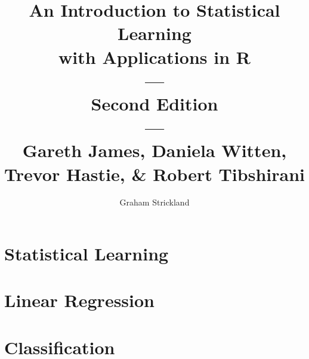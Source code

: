\documentclass{article}
\title{
    An Introduction to Statistical Learning\\with Applications in R\\---\\
    Second Edition\\---\\Gareth James, Daniela Witten, Trevor Hastie,
    \& Robert Tibshirani
}
\author{Graham Strickland}
\numberwithin{figure}{section}
\begin{document}
\maketitle

\setcounter{section}{1}
\section{Statistical Learning}


\section{Linear Regression}


\section{Classification}

\end{document}
